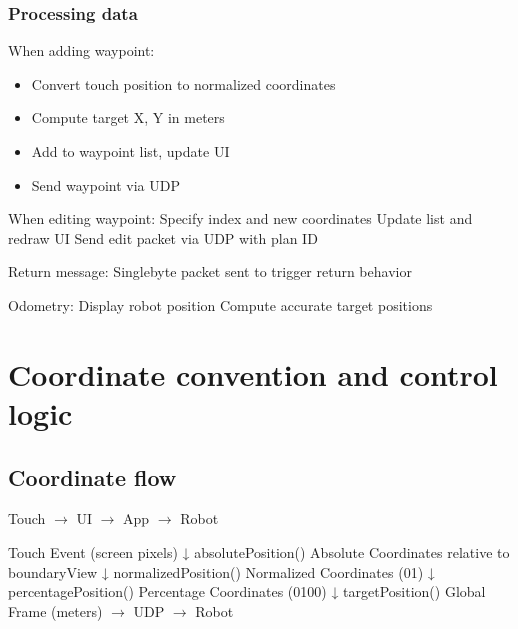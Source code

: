 \documentclass[letterpaper,10pt,english]{sphinxmanual}
\begin{document}
\subsubsection{Processing data}
\label{\detokenize{technical_reference:processing-data}}
\sphinxAtStartPar
When adding waypoint:
\begin{itemize}
\item {} 
\sphinxAtStartPar
Convert touch position to normalized coordinates

\item {} 
\sphinxAtStartPar
Compute target X, Y in meters

\item {} 
\sphinxAtStartPar
Add to waypoint list, update UI

\item {} 
\sphinxAtStartPar
Send waypoint via UDP

\end{itemize}

\sphinxAtStartPar
When editing waypoint:
\sphinxhyphen{} Specify index and new coordinates
\sphinxhyphen{} Update list and redraw UI
\sphinxhyphen{} Send edit packet via UDP with plan ID

\sphinxAtStartPar
Return message:
\sphinxhyphen{} Single\sphinxhyphen{}byte packet sent to trigger return behavior

\sphinxAtStartPar
Odometry:
\sphinxhyphen{} Display robot position
\sphinxhyphen{} Compute accurate target positions


\section{Coordinate convention and control logic}
\label{\detokenize{technical_reference:coordinate-convention-and-control-logic}}

\subsection{Coordinate flow}
\label{\detokenize{technical_reference:coordinate-flow}}
\sphinxAtStartPar
Touch \(\rightarrow\) UI \(\rightarrow\) App \(\rightarrow\) Robot

\begin{sphinxVerbatim}[commandchars=\\\{\}]
Touch Event (screen pixels)
   ↓ absolutePosition()
Absolute Coordinates relative to boundaryView
   ↓ normalizedPosition()
Normalized Coordinates (0\textendash{}1)
   ↓ percentagePosition()
Percentage Coordinates (0\textendash{}100\PYGZpc{})
   ↓ targetPosition()
Global Frame (meters) \(\rightarrow\) UDP \(\rightarrow\) Robot
\end{sphinxVerbatim}
\end{document}
